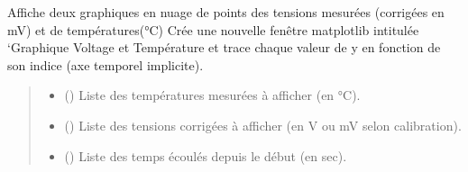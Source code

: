 \documentclass[letterpaper,10pt,english]{sphinxmanual}
\begin{document}
\begin{fulllineitems}
\label{\detokenize{Mesure:Mesure.Graphe_T_V}}
\pysigstartsignatures
\pysiglinewithargsret
{}
{\sphinxparamcomma {}\sphinxparamcomma {}}
{}
\pysigstopsignatures
\sphinxAtStartPar

Affiche deux graphiques en nuage de points des tensions mesurées (corrigées en mV) et de températures(°C)
Crée une nouvelle fenêtre matplotlib intitulée ‘Graphique Voltage et Température et trace
chaque valeur de y en fonction de son indice (axe temporel implicite).
\begin{quote}\begin{description}
\begin{itemize}
\item {} 
\sphinxAtStartPar
{} (\sphinxstyleliteralemphasis{\sphinxupquote{{[}}}\sphinxstyleliteralemphasis{\sphinxupquote{{]}}}) \textendash{} Liste des températures mesurées à afficher (en °C).

\item {} 
\sphinxAtStartPar
{} (\sphinxstyleliteralemphasis{\sphinxupquote{{[}}}\sphinxstyleliteralemphasis{\sphinxupquote{{]}}}) \textendash{} Liste des tensions corrigées à afficher (en V ou mV selon calibration).

\item {} 
\sphinxAtStartPar
{} (\sphinxstyleliteralemphasis{\sphinxupquote{{[}}}\sphinxstyleliteralemphasis{\sphinxupquote{{]}}}) \textendash{} Liste des temps écoulés depuis le début (en sec).

\end{itemize}

\end{description}\end{quote}

\end{fulllineitems}

\end{document}
